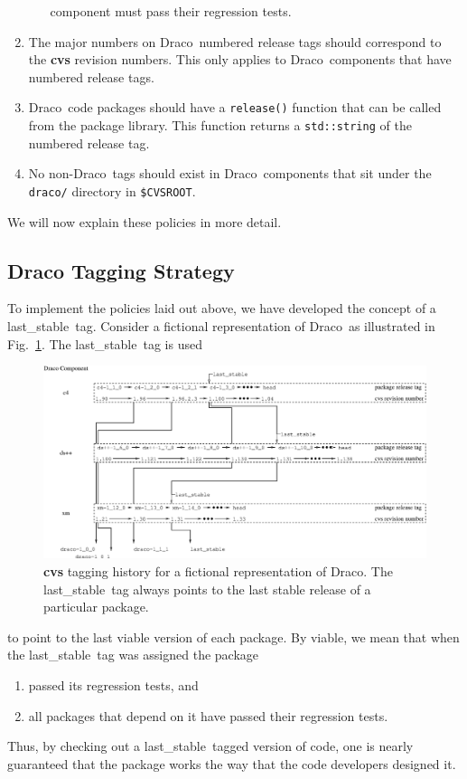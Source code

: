 \documentclass[11pt]{nmemo}
\newcommand{\draco}{{\normalfont\normalsize\sffamily Draco}}
\newcommand{\stable}{{\normalfont\normalsize\ttfamily last\_stable}}
\begin{document}
\begin{enumerate}
\begin{itemize}
    component must pass their regression tests.
  \end{itemize}
\item The major numbers on \draco\ numbered release tags should
  correspond to the {\bf cvs} revision numbers.  This only applies to
  \draco\ components that have numbered release tags.
\item \draco\ code packages should have a \texttt{release()} function
  that can be called from the package library.  This function returns
  a \texttt{std::string} of the numbered release tag.
\item No non-\draco\ tags should exist in \draco\ components that sit
  under the \texttt{draco/} directory in \texttt{\$CVSROOT}.
\end{enumerate}
We will now explain these policies in more detail.

\subsection{Draco Tagging Strategy}
\label{sec:stable-tag}

To implement the policies laid out above, we have developed the
concept of a \stable\ tag.  Consider a fictional representation of
\draco\ as illustrated in Fig.~\ref{fig:tag-strategy}.  The \stable\ 
tag is used
\begin{figure}
  \centerline{\includegraphics[width=6.5in]{tag-strategy.eps}}
  \caption{{\bf cvs} tagging history for a fictional representation of 
    \draco.  The \stable\ tag always points to the last stable release 
    of a particular package.}
  \label{fig:tag-strategy}
\end{figure}
to point to the last viable version of each package.  By viable, we
mean that when the \stable\ tag was assigned the package
\begin{enumerate}
\item passed its regression tests, and
\item all packages that depend on it have passed their regression
  tests.
\end{enumerate}
Thus, by checking out a \stable\ tagged version of code, one is
nearly guaranteed that the package works the way that the code
developers designed it.
\end{document}
